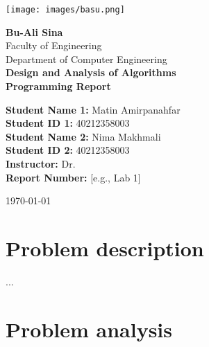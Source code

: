 \documentclass[a4paper]{report}
\begin{document}
\begin{titlepage}
    \centering
    \texttt{[image: images/basu.png]}\par\vspace{1cm}

    \vspace*{2cm}

    {\Large \textbf{Bu-Ali Sina}}\\[0.5cm]
    {\large Faculty of Engineering}\\[0.5cm]
    {\large Department of Computer Engineering}\\[2cm]

    {\Huge \bfseries Design and Analysis of Algorithms}\\[0.5cm]
    {\LARGE \textbf{Programming Report}}\\[2cm]

    \begin{flushleft}
        \textbf{Student Name 1:} Matin Amirpanahfar \\
        \textbf{Student ID 1:} 40212358003 \\[0.5cm]

        \textbf{Student Name 2:} Nima Makhmali \\
        \textbf{Student ID 2:} 40212358003 \\[0.5cm]

        \textbf{Instructor:} Dr.  \\
        \textbf{Report Number:} [e.g., Lab 1] \\
    \end{flushleft}
    \vfill

    {\large \today}
\end{titlepage}

\tableofcontents
\newpage

\chapter{Problem description}

...

\chapter{Problem analysis}
\end{document}
